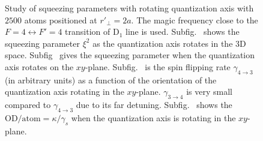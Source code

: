 \documentclass[preprint,aps,pra,onecolumn]{revtex4-1} %
\begin{document}
\begin{figure}
\caption{Study of squeezing parameters with rotating quantization axis with $2500$ atoms positioned at $ r'\!_\perp=2a $. The magic frequency close to the $ F=4 \leftrightarrow F'=4$ transition of $ \mathrm{D}_1 $ line is used. Subfig.~\protect{} shows the squeezing parameter $ \xi^2 $ as the quantization axis rotates in the 3D space. Subfig~\protect{} gives the squeezing parameter when the quantization axis rotates on the $ xy $-plane. Subfig.~\protect{} is the spin flipping rate $ \gamma_{4\rightarrow 3} $ (in arbitrary units) as a function of the orientation of the quantization axis rotating in the $ xy $-plane. $ \gamma_{3\rightarrow 4} $ is very small compared to $ \gamma_{4\rightarrow 3} $ due to its far detuning. Subfig.~\protect{} shows the $ \mathrm{OD}/{\mathrm{atom}}=\kappa/\gamma_s $ when the quantization axis is rotating in the $ xy $-plane.  }\label{fig:squeezing_q_D1_NA2500_r2a}
\end{figure}
\end{document}
